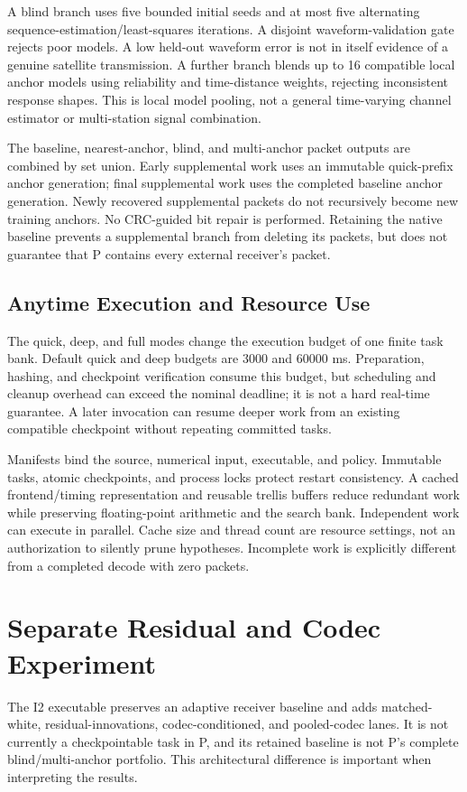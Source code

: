 \documentclass{ieeeaccess}
\begin{document}
A blind branch uses five bounded initial seeds and at most five alternating sequence-estimation/least-squares iterations. A disjoint waveform-validation gate rejects poor models. A low held-out waveform error is not in itself evidence of a genuine satellite transmission. A further branch blends up to 16 compatible local anchor models using reliability and time-distance weights, rejecting inconsistent response shapes. This is local model pooling, not a general time-varying channel estimator or multi-station signal combination.

The baseline, nearest-anchor, blind, and multi-anchor packet outputs are combined by set union. Early supplemental work uses an immutable quick-prefix anchor generation; final supplemental work uses the completed baseline anchor generation. Newly recovered supplemental packets do not recursively become new training anchors. No CRC-guided bit repair is performed. Retaining the native baseline prevents a supplemental branch from deleting its packets, but does not guarantee that P contains every external receiver's packet.

\subsection{Anytime Execution and Resource Use}
The quick, deep, and full modes change the execution budget of one finite task bank. Default quick and deep budgets are 3000 and 60000 ms. Preparation, hashing, and checkpoint verification consume this budget, but scheduling and cleanup overhead can exceed the nominal deadline; it is not a hard real-time guarantee. A later invocation can resume deeper work from an existing compatible checkpoint without repeating committed tasks.

Manifests bind the source, numerical input, executable, and policy. Immutable tasks, atomic checkpoints, and process locks protect restart consistency. A cached frontend/timing representation and reusable trellis buffers reduce redundant work while preserving floating-point arithmetic and the search bank. Independent work can execute in parallel. Cache size and thread count are resource settings, not an authorization to silently prune hypotheses. Incomplete work is explicitly different from a completed decode with zero packets.

\section{Separate Residual and Codec Experiment}
The I2 executable preserves an adaptive receiver baseline and adds matched-white, residual-innovations, codec-conditioned, and pooled-codec lanes. It is not currently a checkpointable task in P, and its retained baseline is not P's complete blind/multi-anchor portfolio. This architectural difference is important when interpreting the results.
\end{document}
